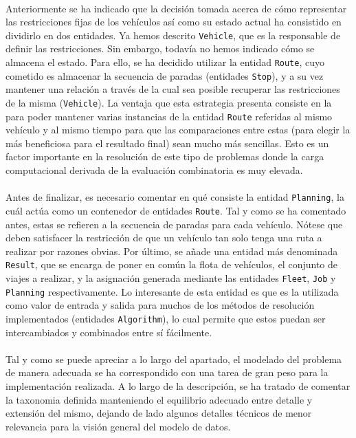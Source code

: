 \documentclass{subfiles}
\begin{document}
          \paragraph{}
          Anteriormente se ha indicado que la decisión tomada acerca de cómo representar las restricciones fijas de los vehículos así como su estado actual ha consistido en dividirlo en dos entidades. Ya hemos descrito \texttt{Vehicle}, que es la responsable de definir las restricciones. Sin embargo, todavía no hemos indicado cómo se almacena el estado. Para ello, se ha decidido utilizar la entidad \texttt{Route}, cuyo cometido es almacenar la secuencia de paradas (entidades \texttt{Stop}), y a su vez mantener una relación a través de la cual sea posible recuperar las restricciones de la misma (\texttt{Vehicle}). La ventaja que esta estrategia presenta consiste en la  para poder mantener varias instancias de la entidad \texttt{Route} referidas al mismo vehículo y al mismo tiempo para que las comparaciones entre estas (para elegir la más beneficiosa para el resultado final) sean mucho más sencillas. Esto es un factor importante en la resolución de este tipo de problemas donde la carga computacional derivada de la evaluación combinatoria es muy elevada.

          \paragraph{}
          Antes de finalizar, es necesario comentar en qué consiste la entidad \texttt{Planning}, la cuál actúa como un contenedor de entidades \texttt{Route}. Tal y como se ha comentado antes, estas se refieren a la secuencia de paradas para cada vehículo. Nótese que deben satisfacer la restricción de que  un vehículo tan solo tenga una ruta a realizar por razones obvias. Por último, se añade una entidad más denominada \texttt{Result}, que se encarga de poner en común la flota de vehículos, el conjunto de viajes a realizar, y la asignación generada mediante las entidades \texttt{Fleet}, \texttt{Job} y \texttt{Planning} respectivamente. Lo interesante de esta entidad es que es la utilizada como valor de entrada y salida para muchos de los métodos de resolución implementados (entidades \texttt{Algorithm}), lo cual permite que estos puedan ser intercambiados y combinados entre sí fácilmente.

          \paragraph{}
          Tal y como se puede apreciar a lo largo del apartado, el modelado del problema de manera adecuada se ha correspondido con una tarea de gran peso para la implementación realizada. A lo largo de la descripción, se ha tratado de comentar la taxonomia definida manteniendo el equilibrio adecuado entre detalle y extensión del mismo, dejando de lado algunos detalles técnicos de menor relevancia para la visión general del modelo de datos.
\end{document}

